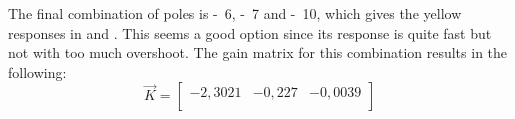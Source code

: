 The final combination of poles is \si{-6}, \si{-7} and \si{-10}, which gives the yellow responses in  and . This seems a good option since its response is quite fast but not with too much overshoot. The gain matrix for this combination results in the following:
%
\begin{equation}  \label{controllerSS}
	\vec{K} = 
	\begin{bmatrix}
		-2,3021 & -0,227 & -0,0039 \\
	\end{bmatrix}
\end{equation}
%